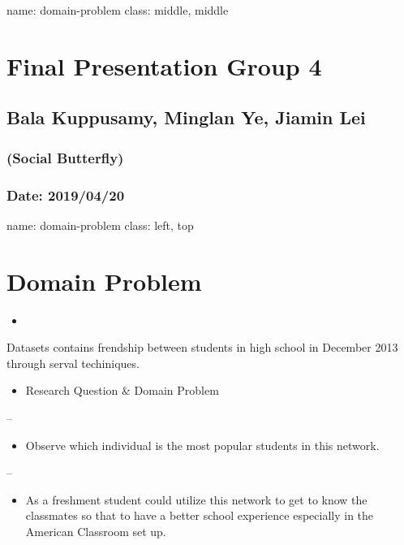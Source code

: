 \documentclass[]{article}
\title{}
\author{}
\date{}
\providecommand{\tightlist}{%
  \setlength{\itemsep}{0pt}\setlength{\parskip}{0pt}}
\begin{document}
name: domain-problem class: middle, middle

\section{Final Presentation Group 4}\label{final-presentation-group-4}

\subsection{Bala Kuppusamy, Minglan Ye, Jiamin
Lei}\label{bala-kuppusamy-minglan-ye-jiamin-lei}

\subsubsection{(Social Butterfly)}\label{social-butterfly}

\subsubsection{Date: 2019/04/20}\label{date-20190420}

name: domain-problem class: left, top

\section{Domain Problem}\label{domain-problem}

\begin{itemize}
\item
\end{itemize}

Datasets contains frendship between students in high school in December
2013 through serval techiniques.

\begin{itemize}
\tightlist
\item
  Research Question \& Domain Problem
\end{itemize}

--

\begin{itemize}
\tightlist
\item
  Observe which individual is the most popular students in this network.
\end{itemize}

--

\begin{itemize}
\tightlist
\item
  As a freshment student could utilize this network to get to know the
  classmates so that to have a better school experience especially in
  the American Classroom set up.
\end{itemize}
\end{document}
